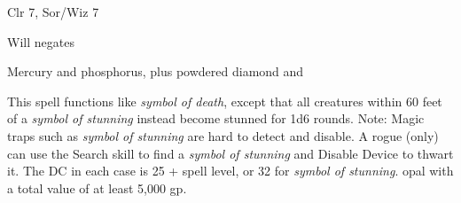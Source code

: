 
\begin{description*}
\item[Level:] Clr 7, Sor/Wiz 7
\item[Saving Throw:] Will negates
\item[Arcane Material Component:] Mercury and phosphorus, plus powdered diamond and
\end{description*}

This spell functions like \textit{symbol of death}, except that all creatures within
60 feet of a \textit{symbol of stunning} instead become stunned for 1d6 rounds.
Note: Magic traps such as \textit{symbol of stunning} are hard to detect
and disable. A rogue (only) can use the Search skill to find a \textit{symbol of
stunning} and Disable Device to thwart it. The DC in each case is 25 + spell level,
or 32 for \textit{symbol of stunning}.
opal with a total value of at least 5,000 gp.